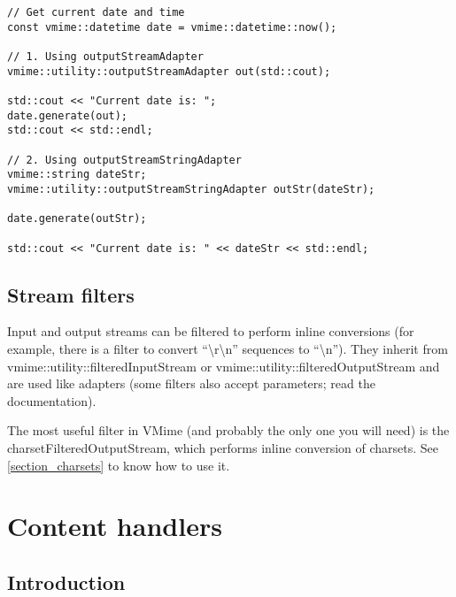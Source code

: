 \begin{lstlisting}[caption={Using stream adapters}]
// Get current date and time
const vmime::datetime date = vmime::datetime::now();

// 1. Using outputStreamAdapter
vmime::utility::outputStreamAdapter out(std::cout);

std::cout << "Current date is: ";
date.generate(out);
std::cout << std::endl;

// 2. Using outputStreamStringAdapter
vmime::string dateStr;
vmime::utility::outputStreamStringAdapter outStr(dateStr);

date.generate(outStr);

std::cout << "Current date is: " << dateStr << std::endl;
\end{lstlisting}


\subsection{Stream filters} %

Input and output streams can be filtered to perform inline conversions (for
example, there is a filter to convert ``{\textbackslash}r{\textbackslash}n''
sequences to ``{\textbackslash}n''). They inherit from
{\vcode vmime::utility::filteredInputStream} or
{\vcode vmime::utility::filteredOutputStream} and are used like adapters (some
filters also accept parameters; read the documentation).

The most useful filter in VMime (and probably the only one you will need) is
the {\vcode charsetFilteredOutputStream}, which performs inline conversion
of charsets. See \ref{section_charsets} to know how to use it.



\section{Content handlers}

\subsection{Introduction} %

